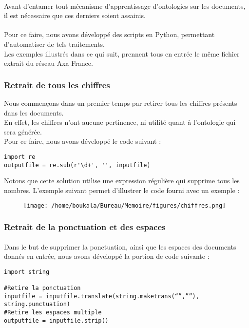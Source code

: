 \documentclass[12pt, a4paper, oneside]{book}
\begin{document}
\paragraph{}
Avant d'entamer tout mécanisme d'apprentissage d'ontologies sur les documents, il est nécessaire que ces derniers soient assainis.
\paragraph{}
Pour ce faire, nous avons développé des scripts en Python, permettant d'automatiser de tels traitements. \\
Les exemples illustrés dans ce qui suit, prennent tous en entrée le même fichier extrait du réseau Axa France.

\subsubsection{Retrait de tous les chiffres}

Nous commençons dans un premier temps par retirer tous les chiffres présents dans les documents.\\
En effet, les chiffres n'ont aucune pertinence, ni utilité quant à l'ontologie qui sera générée.\\
Pour ce faire, nous avons développé le code suivant :

\begin{verbatim}
import re
outputfile = re.sub(r'\d+', '', inputfile)
\end{verbatim}

Notons que cette solution utilise une expression régulière qui supprime tous les nombres.
L'exemple suivant permet d'illustrer le code fourni avec un exemple :


\begin{figure}[h!]
\begin{center}
\texttt{[image: /home/boukala/Bureau/Memoire/figures/chiffres.png]}
\end{center}
\end{figure}






\subsubsection{Retrait de la ponctuation et des espaces}
\paragraph{}
Dans le but de supprimer la ponctuation, ainsi que les espaces des documents donnés en entrée, nous avons développé la portion de code suivante : 
\begin{verbatim}
import string

#Retire la ponctuation
inputfile = inputfile.translate(string.maketrans(“”,””), string.punctuation) 
#Retire les espaces multiple
outputfile = inputfile.strip()
\end{verbatim}
\end{document}
